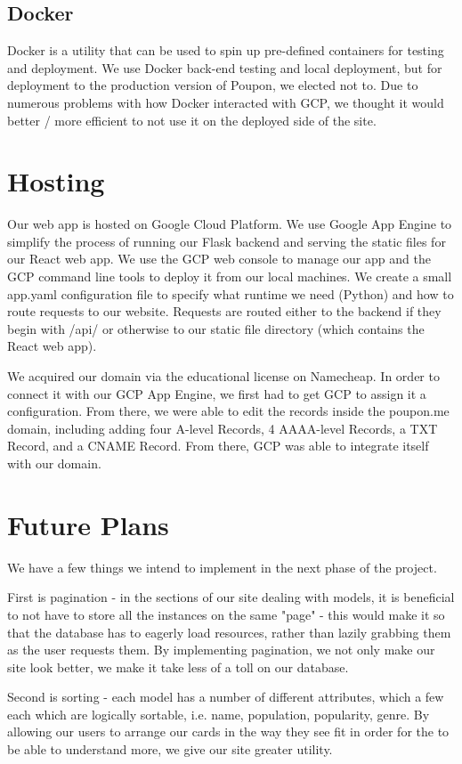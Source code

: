 \documentclass{scrartcl}
\begin{document}
\subsection{Docker}
Docker is a utility that can be used to spin up pre-defined containers for testing and deployment. We use Docker back-end testing and local deployment, but for deployment to the production version of Poupon, we elected not to. Due to numerous problems with how Docker interacted with GCP, we thought it would better / more efficient to not use it on the deployed side of the site.

\section{Hosting}
Our web app is hosted on Google Cloud Platform. We use Google App Engine to simplify the process of running our Flask backend and serving the static files for our React web app. We use the GCP web console to manage our app and the GCP command line tools to deploy it from our local machines. We create a small app.yaml configuration file to specify what runtime we need (Python) and how to route requests to our website. Requests are routed either to the backend if they begin with /api/ or otherwise to our static file directory (which contains the React web app).

We acquired our domain via the educational license on Namecheap. In order to connect it with our GCP App Engine, we first had to get GCP to assign it a configuration. From there, we were able to edit the records inside the poupon.me domain, including adding four A-level Records, 4 AAAA-level Records, a TXT Record, and a CNAME Record. From there, GCP was able to integrate itself with our domain.

\section{Future Plans}
We have a few things we intend to implement in the next phase of the project.

First is pagination - in the sections of our site dealing with models, it is beneficial to not have to store all the instances on the same "page" - this would make it so that the database has to eagerly load resources, rather than lazily grabbing them as the user requests them. By implementing pagination, we not only make our site look better, we make it take less of a toll on our database.

Second is sorting - each model has a number of different attributes, which a few each which are logically sortable, i.e. name, population, popularity, genre. By allowing our users to arrange our cards in the way they see fit in order for the to be able to understand more, we give our site greater utility.
\end{document}

